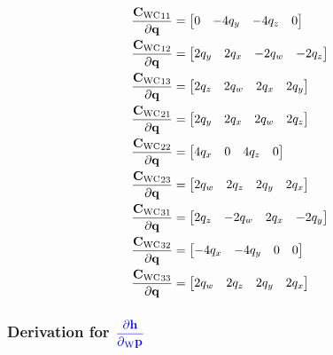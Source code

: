 \begin{align}
  \dfrac{{{{{{{\mathbf{C}}}}_{{\text{W}}{\text{C}}}}}}_{11}}{\partial{{{\mathbf{q}}}}} &=
    \begin{bmatrix}
    0 & -4q_{y} & -4q_{z} & 0
    \end{bmatrix} \\
  \dfrac{{{{{{{\mathbf{C}}}}_{{\text{W}}{\text{C}}}}}}_{12}}{\partial{{{\mathbf{q}}}}} &=
    \begin{bmatrix}
      2q_{y} & 2q_{x} & -2q_{w} & -2q_{z}
    \end{bmatrix} \\
  \dfrac{{{{{{{\mathbf{C}}}}_{{\text{W}}{\text{C}}}}}}_{13}}{\partial{{{\mathbf{q}}}}} &=
    \begin{bmatrix}
      2q_{z} & 2q_{w} & 2q_{x} & 2q_{y}
    \end{bmatrix} \\
  \dfrac{{{{{{{\mathbf{C}}}}_{{\text{W}}{\text{C}}}}}}_{21}}{\partial{{{\mathbf{q}}}}} &=
  \begin{bmatrix}
    2q_{y} & 2q_{x} & 2q_{w} & 2q_{z}
  \end{bmatrix} \\
  \dfrac{{{{{{{\mathbf{C}}}}_{{\text{W}}{\text{C}}}}}}_{22}}{\partial{{{\mathbf{q}}}}} &=
    \begin{bmatrix}
      4q_{x} & 0 & 4q_{z} & 0
    \end{bmatrix} \\
  \dfrac{{{{{{{\mathbf{C}}}}_{{\text{W}}{\text{C}}}}}}_{23}}{\partial{{{\mathbf{q}}}}} &=
    \begin{bmatrix}
      2q_{w} & 2q_{z} & 2q_{y} & 2q_{x}
    \end{bmatrix} \\
  \dfrac{{{{{{{\mathbf{C}}}}_{{\text{W}}{\text{C}}}}}}_{31}}{\partial{{{\mathbf{q}}}}} &=
    \begin{bmatrix}
      2q_{z} & -2q_{w} & 2q_{x} & -2q_{y}
    \end{bmatrix} \\
  \dfrac{{{{{{{\mathbf{C}}}}_{{\text{W}}{\text{C}}}}}}_{32}}{\partial{{{\mathbf{q}}}}} &=
    \begin{bmatrix}
      -4q_{x} & -4q_{y} & 0 & 0
    \end{bmatrix} \\
  \dfrac{{{{{{{\mathbf{C}}}}_{{\text{W}}{\text{C}}}}}}_{33}}{\partial{{{\mathbf{q}}}}} &=
    \begin{bmatrix}
      2q_{w} & 2q_{z} & 2q_{y} & 2q_{x}
    \end{bmatrix}
\end{align}


\subsubsection*{Derivation for
$\color{blue} \dfrac{\partial{{{\mathbf{h}}}}}{\partial{{{{{}_{{\text{W}}}} {{\mathbf{p}}}_{}}}}}$}

